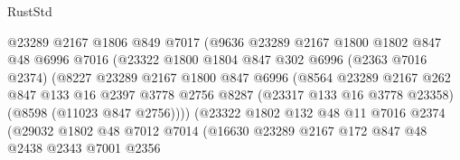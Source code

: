 \begin{lexlean}{RustStd}
\begin{coremodule}
                              @23289
                              @2167
                              @1806
                              @849
                              @7017
                              (@9636
                                @23289
                                @2167
                                @1800
                                @1802
                                @847
                                @48
                                @6996
                                @7016
                                (@23322
                                  @1800
                                  @1804
                                  @847
                                  @302
                                  @6996
                                  (@2363 @7016 @2374)
                                  (@8227
                                    @23289
                                    @2167
                                    @1800
                                    @847
                                    @6996
                                    (@8564
                                      @23289
                                      @2167
                                      @262
                                      @847
                                      @133
                                      @16
                                      @2397
                                      @3778
                                      @2756
                                      @8287
                                      (@23317 @133 @16 @3778 @23358)
                                      (@8598 (@11023 @847 @2756))))
                                  (@23322
                                    @1802
                                    @132
                                    @48
                                    @11
                                    @7016
                                    @2374
                                    (@29032
                                      @1802
                                      @48
                                      @7012
                                      @7014
                                      (@16630
                                        @23289
                                        @2167
                                        @172
                                        @847
                                        @48
                                        @2438
                                        @2343
                                        @7001
                                        @2356

\end{coremodule}
\end{lexlean}
